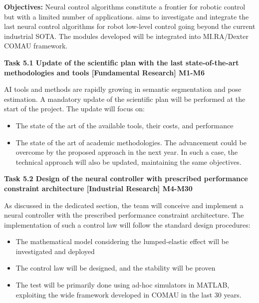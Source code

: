 
\begin{planactivitybody}
\textbf{Objectives:} Neural control algorithms constitute a frontier for
robotic control but with a limited number of applications.
 aims to investigate and integrate the last neural
control algorithms for robot low-level control going beyond the current
industrial SOTA. The modules developed will be integrated into
MI.RA/Dexter COMAU framework.

\plantaskskip
\textbf{Task 5.1 Update of the scientific plan with the last
state-of-the-art methodologies and tools {[}Fundamental Research{]}
M1-M6}

AI tools and methods are rapidly growing in semantic segmentation and
pose estimation. A mandatory update of the scientific plan will be
performed at the start of the project. The update will focus on:

\begin{itemize}
\item
  The state of the art of the available tools, their costs, and
  performance
\item
  The state of the art of academic methodologies. The advancement could
  be overcome by the proposed approach in the next year. In such a case,
  the technical approach will also be updated, maintaining the same
  objectives.
\end{itemize}

\plantaskskip
\textbf{Task 5.2 Design of the neural controller with prescribed
performance constraint architecture {[}Industrial Research{]} M4-M30}

As discussed in the dedicated section, the team will conceive and
implement a neural controller with the prescribed performance constraint
architecture. The implementation of such a control law will follow the
standard design procedures:

\begin{itemize}
\item
  The mathematical model considering the lumped-elastic effect will be
  investigated and deployed
\item
  The control law will be designed, and the stability will be proven
\item
  The test will be primarily done using ad-hoc simulators in MATLAB,
  exploiting the wide framework developed in COMAU in the last 30 years.
\end{itemize}


\end{planactivitybody}
